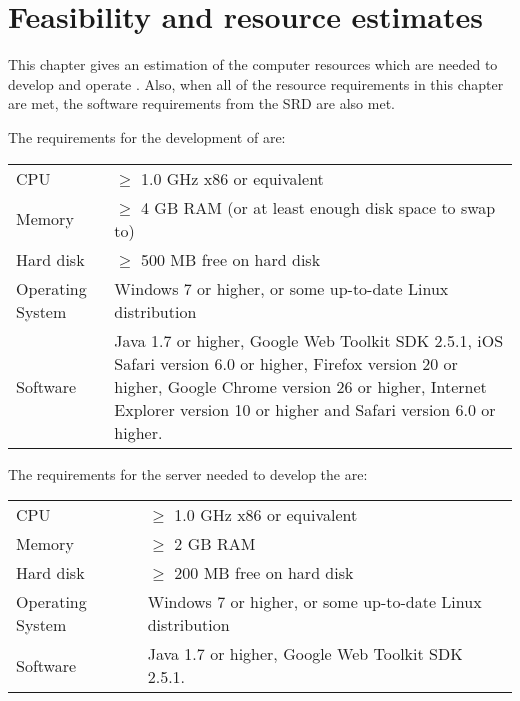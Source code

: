 \chapter{Feasibility and resource estimates}
\label{chap:feasresest}

This chapter gives an estimation of the computer resources which are needed to develop and operate \projectname{}. Also, when all of the resource requirements in this chapter are met, the software requirements  from the SRD \cite{srd} are also met.

\fpstartparagraph{} The requirements for the development of \projectname{} are:

\begin{center}
\begin{tabular}{p{} p{}}
CPU &  $\geq$ 1.0 GHz x86 or equivalent \\
Memory & $\geq$ 4 GB RAM (or at least enough disk space to swap to) \\
Hard disk & $\geq$ 500 MB free on hard disk \\
Operating System & Windows 7 or higher, or some up-to-date Linux distribution\\
Software & Java 1.7 or higher, Google Web Toolkit SDK 2.5.1, iOS Safari version 6.0 or higher, Firefox version 20 or higher, Google Chrome version 26 or higher, Internet Explorer version 10 or higher and Safari version 6.0 or higher. \\
\end{tabular}
\end{center}

\fpstartparagraph{} The requirements for the server needed to develop the \applicationname{} are:

\begin{center}
\begin{tabular}{p{} p{}}
CPU & $\geq$ 1.0 GHz x86 or equivalent \\
Memory & $\geq$ 2 GB RAM \\
Hard disk & $\geq$ 200 MB free on hard disk \\
Operating System & Windows 7 or higher, or some up-to-date Linux distribution\\
Software & Java 1.7 or higher, Google Web Toolkit SDK 2.5.1.\\
\end{tabular}
\end{center}

